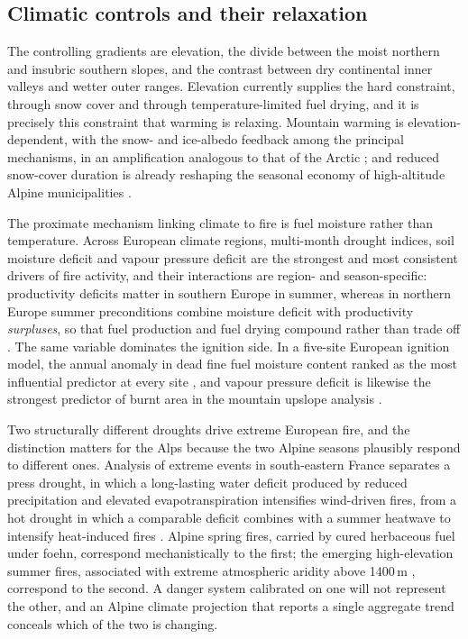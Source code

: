 \documentclass[11pt,a4paper]{article}
\begin{document}
\subsection{Climatic controls and their relaxation}

The controlling gradients are elevation, the divide between the moist northern and insubric southern slopes, and the contrast between dry continental inner valleys and wetter outer ranges. Elevation currently supplies the hard constraint, through snow cover and through temperature-limited fuel drying, and it is precisely this constraint that warming is relaxing. Mountain warming is elevation-dependent, with the snow- and ice-albedo feedback among the principal mechanisms, in an amplification analogous to that of the Arctic \citep{rangwala_climate_2012}; and reduced snow-cover duration is already reshaping the seasonal economy of high-altitude Alpine municipalities \citep{pede_mountain_2022}.

The proximate mechanism linking climate to fire is fuel moisture rather than temperature. Across European climate regions, multi-month drought indices, soil moisture deficit and vapour pressure deficit are the strongest and most consistent drivers of fire activity, and their interactions are region- and season-specific: productivity deficits matter in southern Europe in summer, whereas in northern Europe summer preconditions combine moisture deficit with productivity \emph{surpluses}, so that fuel production and fuel drying compound rather than trade off \citep{miller_compounding_2025}. The same variable dominates the ignition side. In a five-site European ignition model, the annual anomaly in dead fine fuel moisture content ranked as the most influential predictor at every site \citep{gelabert_assessing_2025}, and vapour pressure deficit is likewise the strongest predictor of burnt area in the mountain upslope analysis \citep{beloiu_climatedriven_2026}.

Two structurally different droughts drive extreme European fire, and the distinction matters for the Alps because the two Alpine seasons plausibly respond to different ones. Analysis of extreme events in south-eastern France separates a press drought, in which a long-lasting water deficit produced by reduced precipitation and elevated evapotranspiration intensifies wind-driven fires, from a hot drought in which a comparable deficit combines with a summer heatwave to intensify heat-induced fires \citep{ruffault_extreme_2018}. Alpine spring fires, carried by cured herbaceous fuel under foehn, correspond mechanistically to the first; the emerging high-elevation summer fires, associated with extreme atmospheric aridity above 1400\,m \citep{beloiu_climatedriven_2026}, correspond to the second. A danger system calibrated on one will not represent the other, and an Alpine climate projection that reports a single aggregate trend conceals which of the two is changing.
\end{document}

